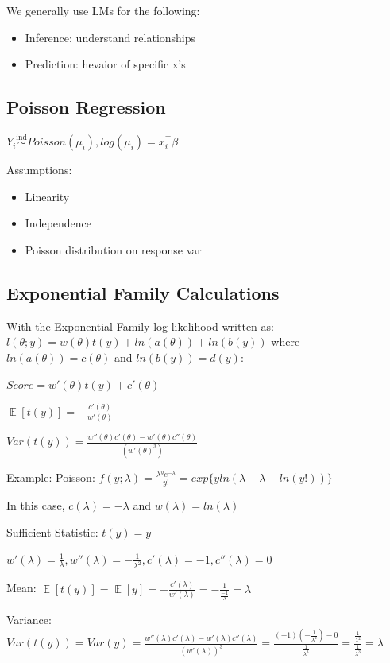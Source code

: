 \documentclass{article}
\DeclareMathOperator{\EX}{\mathbb{E}} %
\newcommand{\inddist}{\overset{\mathrm{ind}}{\sim}}
\begin{document}
We generally use LMs for the following:
\begin{itemize}
    \item Inference: understand relationships
    \item Prediction: hevaior of specific x's
\end{itemize}


\subsection{Poisson Regression}

$Y_i \inddist Poisson(\mu_i), log(\mu_i) = x_i^{\top}\beta$

Assumptions: 
\begin{itemize}
    \item Linearity
    \item Independence
    \item Poisson distribution on response var
\end{itemize}


\subsection{Exponential Family Calculations}

With the Exponential Family log-likelihood written as: $l(\theta; y) = w(\theta)t(y) + ln(a(\theta)) + ln(b(y))$ where $ln(a(\theta)) = c(\theta)$ and $ln(b(y)) = d(y)$:

$Score = w'(\theta)t(y) + c'(\theta)$

$\EX[t(y)] = -\frac{c'(\theta)}{w'(\theta)}$

$Var(t(y)) = \frac{w''(\theta)c'(\theta) - w'(\theta)c''(\theta)}{(w'(\theta)^3)}$

\underline{Example}: Poisson: $f(y; \lambda) = \frac{\lambda^y e^{-\lambda}}{y!} = exp\{yln(\lambda - \lambda - ln(y!))\}$

In this case, $c(\lambda) = -\lambda$ and $w(\lambda) = ln(\lambda)$

Sufficient Statistic: $t(y) = y$

$w'(\lambda) = \frac{1}{\lambda}, w''(\lambda) = -\frac{1}{\lambda^2}, c'(\lambda) = -1, c''(\lambda) = 0$

Mean: $\EX[t(y)] = \EX[y] = -\frac{c'(\lambda)}{w'(\lambda)} = -\frac{1}{\frac{-1}{\lambda}} = \lambda$

Variance: $Var(t(y)) = Var(y) = \frac{w''(\lambda)c'(\lambda) - w'(\lambda)c''(\lambda)}{(w'(\lambda))^3} = \frac{(-1)(-\frac{1}{\lambda^2}) - 0}{\frac{1}{\lambda^3}} = \frac{\frac{1}{\lambda^2}}{\frac{1}{\lambda^3}} = \lambda$
\end{document}
